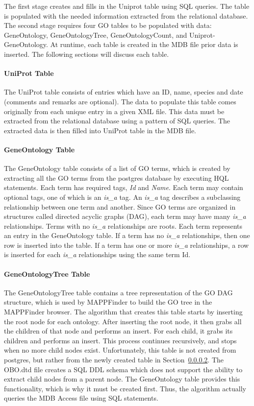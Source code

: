 The first stage creates and fills in the Uniprot table using SQL queries.  The table is populated with the needed information extracted from the relational database. The second stage requires four GO tables to be populated with data: GeneOntology, GeneOntologyTree, GeneOntologyCount, and Uniprot-GeneOntology. At runtime, each table is created in the MDB file prior data is inserted. The following sections will discuss each table.


\paragraph{UniProt Table}
\label{uniprottable}
The UniProt table consists of entries which have an ID, name, species and date (comments and remarks are optional).  The data to populate this table comes originally from each unique entry in a given XML file.  This data must be extracted from the relational database using a pattern of SQL queries.  The extracted data is then filled into UniProt table in the MDB file.

\paragraph{GeneOntology Table}
\label{gotable}
The GeneOntology table consists of a list of GO terms, which is created by extracting all the
GO terms from the postgres database by executing HQL statements. Each term has required tags, \emph{Id} and \emph{Name}.
Each term may contain optional tags, one of which is an \emph{is\_a} tag. An \emph{is\_a} tag describes a
subclassing relationship between one term and another. Since GO terms
are organized in structures called directed acyclic graphs (DAG), each term may have many \emph{is\_a} relationships.
Terms with no \emph{is\_a} relationships are roots. Each term represents an entry in the GeneOntology table. If a term
has no \emph{is\_a} relationships, then one row is inserted into the table. If a term has one or more
\emph{is\_a} relationships, a row is inserted for each \emph{is\_a} relationships using the same term Id.


\paragraph{GeneOntologyTree Table}
The GeneOntologyTree table contains a tree representation of the GO DAG structure, which is used by MAPPFinder
to build the GO tree in the MAPPFinder browser. The algorithm that creates this table starts by inserting the root
node for each ontology. After inserting the root node, it then grabs all the children of that node and performs an insert.
For each child, it grabs its children
and performs an insert. This process continues recursively, and stops when no more child nodes exist.
Unfortunately, this table is not created from postgres, but rather from the
newly created table in Section~\ref{gotable}. The OBO.dtd file creates a SQL DDL schema which does not support
the ability to extract child nodes from a parent node. The GeneOntology table provides this functionality, which
is why it must be created first. Thus, the algorithm actually queries the MDB Access file using SQL statements.



